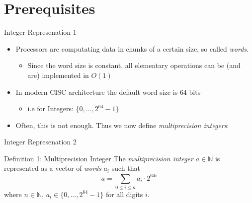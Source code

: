 \documentclass[12pt]{beamer}
\begin{document}
\section{Prerequisites}

\begin{frame}{Integer Represenation 1}
\begin{itemize}
\item Processors are computating data in chunks of a certain size, so called \emph{words}.
\begin{itemize}
\item Since the word size is constant, all elementary operations can be (and are) implemented in $O(1)$
\end{itemize}
\item In modern CISC architecture the default word size is $64$ bits
\begin{itemize}
\item i.e for Integers: $\{0,\dots, 2^{64} -1\}$
\end{itemize}
\item Often, this is not enough. Thus we now define \emph{multiprecision integers}:
\end{itemize}
\end{frame}

\begin{frame}{Integer Represenation 2}
\begin{block}{Definition 1: Multiprecision Integer}
The \emph{multiprecision integer} $a \in \mathbb{N}$ is represented as a vector of \emph{words} $a_i$ such that
\[
a = \sum_{0 \leq i \leq n} a_i \cdot 2^{64i}
\]
where $n \in \mathbb{N}$, $a_i \in \{0, \dots, 2^{64} -1 \}$ for all digits $i$.
\end{block}
\end{frame}
\end{document}
